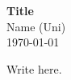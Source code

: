 \documentclass[12pt]{article}
\begin{document}
\begin{flushleft}
\textbf{Title} \\
Name (Uni) \\
\today
\end{flushleft}

\vspace{0.1in}

Write here.
\end{document}
